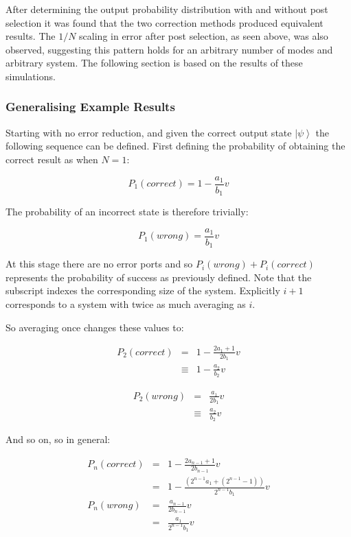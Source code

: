 \documentclass[aps,pra,twocolumn,superscriptaddress,numerical]{revtex4-1}
\begin{document}
		
		After determining the output probability distribution with and without post selection it was found that the two correction methods produced equivalent results. The $1/N$ scaling in error after post selection, as seen above, was also observed, suggesting this pattern holds for an arbitrary number of modes and arbitrary system. The following section is based on the results of these simulations.
		
	\subsubsection{Generalising Example Results}
		
		Starting with no error reduction, and given the correct output state $\left|\psi\right\rangle $ the following sequence can be defined. First defining the probability of obtaining the correct result as when $N=1$:
			
		\begin{equation}
			P_{1}(correct)=1-\frac{a_{1}}{b_{1}}v
		\end{equation}
			
		The probability of an incorrect state is therefore trivially:
			
		\begin{equation}
			P_{1}(wrong)=\frac{a_{1}}{b_{1}}v
		\end{equation}
			
		At this stage there are no error ports and so $P_{i}(wrong)+P_{i}(correct)$	represents the probability of success as previously defined. Note that the subscript indexes the corresponding size of the system. Explicitly $i+1$ corresponds to a system with twice as much averaging as $i$.
			
		So averaging once changes these values to:
			
		\begin{eqnarray}
			P_{2}(correct) & = & 1-\frac{2a_{1}+1}{2b_{1}}v\nonumber \\
			& \equiv & 1-\frac{a_{2}}{b_{2}}v
		\end{eqnarray}
		
		\begin{eqnarray}
			P_{2}(wrong) & = & \frac{a_{1}}{2b_{1}}v\nonumber \\
			& \equiv & \frac{a_{2}}{b_{2}}v
		\end{eqnarray}
			
		And so on, so in general:
			
		\begin{eqnarray}
			P_{n}(correct) & = & 1-\frac{2a_{n-1}+1}{2b_{n-1}}v\nonumber \\
			& = & 1-\frac{\left(2^{n-1}a_{1}+\left(2^{n-1}-1\right)\right)}{2^{n-1}b_{1}}v\\
			P_{n}(wrong) & = & \frac{a_{n-1}}{2b_{n-1}}v\nonumber \\
			& = & \frac{a_{1}}{2^{n-1}b_{1}}v
		\end{eqnarray}
			
\end{document}
